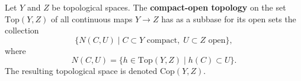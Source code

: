 Let $Y$ and $Z$ be topological spaces. The \textbf{compact-open topology} on the set $\text{Top}(Y, Z)$ of all continuous maps $Y \to Z$ has as a subbase for its open sets the collection
$$\{N(C, U) \mid C \subset Y \text{ compact}, \; U \subset Z \text{ open}\},$$
where
$$N(C, U) = \{h \in \text{Top}(Y, Z) \mid h(C) \subset U\}.$$
The resulting topological space is denoted $\text{Cop}(Y, Z)$.
